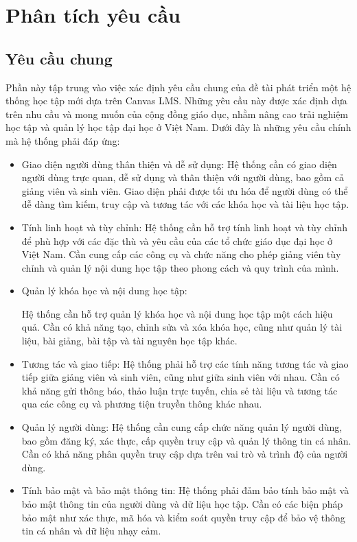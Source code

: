 \documentclass[../Thesis.tex]{subfiles}
\begin{document}
\section{Phân tích yêu cầu}
    \subsection{Yêu cầu chung}
        Phần này tập trung vào việc xác định yêu cầu chung của đề tài phát triển một hệ thống học tập mới dựa trên Canvas LMS. Những yêu cầu này được xác định dựa trên nhu cầu và mong muốn của cộng đồng giáo dục, nhằm nâng cao trải nghiệm học tập và quản lý học tập đại học ở Việt Nam. Dưới đây là những yêu cầu chính mà hệ thống phải đáp ứng:
        \begin{itemize}
        
            \item Giao diện người dùng thân thiện và dễ sử dụng:
            Hệ thống cần có giao diện người dùng trực quan, dễ sử dụng và thân thiện với người dùng, bao gồm cả giảng viên và sinh viên.
            Giao diện phải được tối ưu hóa để người dùng có thể dễ dàng tìm kiếm, truy cập và tương tác với các khóa học và tài liệu học tập.
            
            \item Tính linh hoạt và tùy chỉnh:
            Hệ thống cần hỗ trợ tính linh hoạt và tùy chỉnh để phù hợp với các đặc thù và yêu cầu của các tổ chức giáo dục đại học ở Việt Nam.
            Cần cung cấp các công cụ và chức năng cho phép giảng viên tùy chỉnh và quản lý nội dung học tập theo phong cách và quy trình của mình.
            
            \item Quản lý khóa học và nội dung học tập:
            
            Hệ thống cần hỗ trợ quản lý khóa học và nội dung học tập một cách hiệu quả.
            Cần có khả năng tạo, chỉnh sửa và xóa khóa học, cũng như quản lý tài liệu, bài giảng, bài tập và tài nguyên học tập khác.
            
            \item Tương tác và giao tiếp:
            Hệ thống phải hỗ trợ các tính năng tương tác và giao tiếp giữa giảng viên và sinh viên, cũng như giữa sinh viên với nhau.
            Cần có khả năng gửi thông báo, thảo luận trực tuyến, chia sẻ tài liệu và tương tác qua các công cụ và phương tiện truyền thông khác nhau.
            
            \item Quản lý người dùng:
            Hệ thống cần cung cấp chức năng quản lý người dùng, bao gồm đăng ký, xác thực, cấp quyền truy cập và quản lý thông tin cá nhân.
            Cần có khả năng phân quyền truy cập dựa trên vai trò và trình độ của người dùng.
            
            \item Tính bảo mật và bảo mật thông tin:
            Hệ thống phải đảm bảo tính bảo mật và bảo mật thông tin của người dùng và dữ liệu học tập.
            Cần có các biện pháp bảo mật như xác thực, mã hóa và kiểm soát quyền truy cập để bảo vệ thông tin cá nhân và dữ liệu nhạy cảm.
        \end{itemize}
\end{document}
